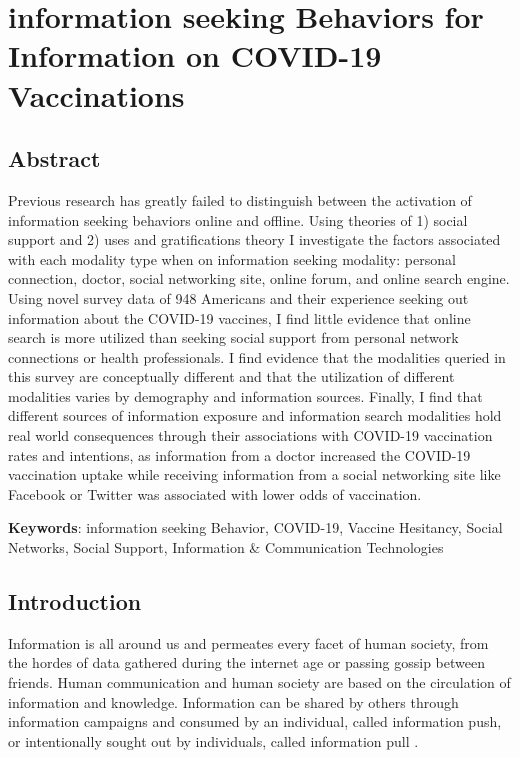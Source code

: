 \hypertarget{paper-2}{%
\chapter{information seeking Behaviors for Information on COVID-19 Vaccinations}\label{paper-2}}

\hypertarget{abstract}{%
\section{Abstract}\label{abstract}}

Previous research has greatly failed to distinguish between the activation of
information seeking behaviors online and offline. Using theories of 1) social
support and 2) uses and gratifications theory I investigate the factors associated
with each modality type when on information seeking modality: personal connection,
doctor, social networking site, online forum, and online search engine. Using
novel survey data of 948 Americans and their experience seeking out
information about the COVID-19 vaccines, I find little evidence that online
search is more utilized than seeking social support from personal network
connections or health professionals. I find evidence that the modalities queried
in this survey are conceptually different and that the utilization of different
modalities varies by demography and information sources. Finally, I find that
different sources of information exposure and information search modalities hold real
world consequences through their associations with COVID-19 vaccination rates
and intentions, as information from a doctor increased the COVID-19 vaccination
uptake while receiving information from a social networking site like Facebook
or Twitter was associated with lower odds of vaccination.

\textbf{Keywords}: information seeking Behavior, COVID-19, Vaccine Hesitancy, Social Networks, Social Support, Information \& Communication Technologies

\hypertarget{intro-1}{%
\section{Introduction}\label{intro-1}}

Information is all around us and permeates every facet of human society, from
the hordes of data gathered during the internet age or passing gossip between
friends. Human communication and human society are based on the circulation of
information and knowledge. Information can be shared by others through
information campaigns and consumed by an individual, called information push, or
intentionally sought out by individuals, called information pull
\citep{cybenkoFoundationsInformationPush1999}.

